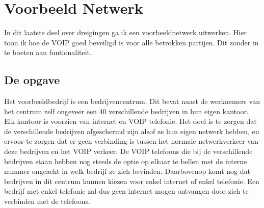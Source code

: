\documentclass[pdftex,a4paper,12pt,twoside]{report}
\begin{document}
\section{Voorbeeld Netwerk}
In dit laatste deel over dreigingen ga ik een voorbeeldnetwerk uitwerken. Hier toon ik hoe de VOIP goed beveiligd is voor alle betrokken partijen. Dit zonder in te boeten aan funtionaliteit.
\newpage
\subsection{De opgave}
Het voorbeeldbedrijf is een bedrijvencentrum. Dit bevat naast de werknemers van het centrum zelf ongeveer een 40 verschillende bedrijven in hun eigen kantoor. Elk kantoor is voorzien van internet en VOIP telefonie. Het doel is te zorgen dat de verschillende bedrijven afgeschermd zijn alsof ze hun eigen netwerk hebben, en ervoor te zorgen dat er geen verbinding is tussen het normale netwerkverkeer van deze bedrijven en het VOIP verkeer. De VOIP telefoons die bij de verschillende bedrijven staan hebben nog steeds de optie op elkaar te bellen met de interne nummer ongeacht in welk bedrijf ze zich bevinden. Daarbovenop komt nog dat bedrijven in dit centrum kunnen kiezen voor enkel internet of enkel telefonie. Een bedrijf met enkel telefonie zal dus geen internet mogen ontvangen door zich te verbinden met de telefoons.
\end{document}
